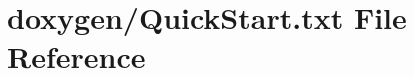 \hypertarget{QuickStart_8txt}{\section{doxygen/\+Quick\+Start.txt File Reference}
\label{QuickStart_8txt}
}
